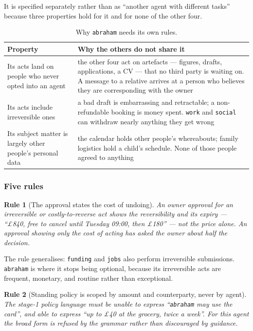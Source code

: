 \documentclass[11pt]{article}
\newtheorem{drule}{Rule}
\newcommand{\code}[1]{\texttt{\small #1}}
\begin{document}
It is specified separately rather than as ``another agent with different tasks'' because three properties hold for it and for none of the other four.

\begin{table}[h]
\centering\small
\caption{Why \code{abraham} needs its own rules.}
\label{tab:abraham-diff}
\begin{tabular}{@{}L{4.4cm}L{8.6cm}@{}}
\toprule
\textbf{Property} & \textbf{Why the others do not share it} \\
\midrule
Its acts land on people who never opted into an agent & the other four act on artefacts --- figures, drafts, applications, a CV --- that no third party is waiting on. A message to a relative arrives at a person who believes they are corresponding with the owner \\
Its acts include irreversible ones & a bad draft is embarrassing and retractable; a non-refundable booking is money spent. \code{work} and \code{social} can withdraw nearly anything they get wrong \\
Its subject matter is largely other people's personal data & the calendar holds other people's whereabouts; family logistics hold a child's schedule. None of those people agreed to anything \\
\bottomrule
\end{tabular}
\end{table}

\subsubsection{Five rules}

\begin{drule}[The approval states the cost of undoing]
\label{rule:reversibility}
An owner approval for an irreversible or costly-to-reverse act shows the reversibility and its expiry --- \emph{``\pounds840, free to cancel until Tuesday 09:00, then \pounds180''} --- not the price alone. An approval showing only the cost of acting has asked the owner about half the decision.
\end{drule}

The rule generalises: \code{funding} and \code{jobs} also perform irreversible submissions. \code{abraham} is where it stops being optional, because its irreversible acts are frequent, monetary, and routine rather than exceptional.

\begin{drule}[Standing policy is scoped by amount and counterparty, never by agent]
\label{rule:abrahampolicy}
The stage-1 policy language must be unable to express \emph{``\code{abraham} may use the card''}, and able to express \emph{``up to \pounds40 at the grocery, twice a week''}. For this agent the broad form is refused by the grammar rather than discouraged by guidance.
\end{drule}
\end{document}
